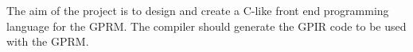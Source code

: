 The aim of the project is to design and create a C-like front end programming language for the GPRM. The compiler should generate the GPIR code to be used with the GPRM.


